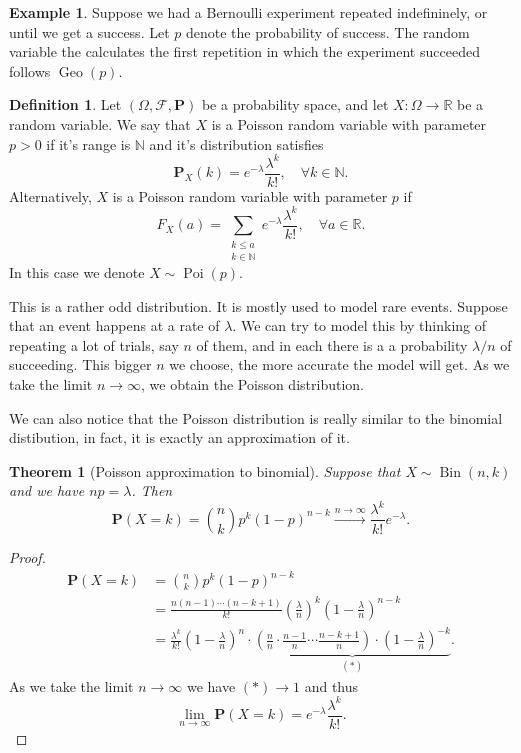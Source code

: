 \documentclass[11pt,a4paper]{article}
\theoremstyle{definition}
\newtheorem{definition}{Definition}[section]
\newtheorem{example}{Example}[section]
\theoremstyle{plain}
\newtheorem{theorem}{Theorem}[section]
\DeclareMathOperator{\Bin}{Bin}
\DeclareMathOperator{\Geo}{Geo}
\DeclareMathOperator{\Poi}{Poi}
\newcommand{\N}{\mathbb{N}}
\newcommand{\R}{\mathbb{R}}
\newcommand{\Prob}{\mathbf{P}}
\begin{document}
  \begin{example}
    Suppose we had a Bernoulli experiment repeated indefininely, or until
    we get a success. Let $p$ denote the probability of success.
    The random variable the calculates the first repetition in which the
    experiment succeeded follows $\Geo(p)$.
  \end{example}

  \begin{definition}
    Let $(\Omega ,\mathcal F, \Prob)$ be a probability space,
    and let $X \colon \Omega \to \R$ be a random variable.
    We say that $X$ is a Poisson random variable with parameter
    $p > 0$ if it's range is $\N$ and it's distribution satisfies
    \[
      \Prob_X(k) = e^{-\lambda} \frac{\lambda^k}{k!}, \quad 
      \forall k \in \N.
    \]
    Alternatively, $X$ is a Poisson random variable with parameter
    $p$ if
    \[
      F_X(a) = \sum_{\substack{k \le a \\ k \in \N}}
      e^{-\lambda} \frac{\lambda^k}{k!}, \quad \forall a \in \R.
    \]
    In this case we denote $X \sim \Poi(p)$.
  \end{definition}
  
  This is a rather odd distribution. It is mostly used to model rare events.
  Suppose that an event happens at a rate of $\lambda$.
  We can try to model this by thinking of repeating a lot of trials,
  say $n$ of them, and in each there is a a probability $\lambda / n$ of 
  succeeding. This bigger $n$ we choose, the more accurate the model will get.
  As we take the limit $n \to \infty$, we obtain the Poisson distribution.
  
  We can also notice that the Poisson distribution is really similar to
  the binomial distibution, in fact, it is exactly an approximation of it.

  \begin{theorem}[Poisson approximation to binomial]
    Suppose that $X \sim \Bin(n,k)$ and we have
    $np = \lambda$. Then
    \[
      \Prob(X = k) = 
      \binom{n}{k} p^{k} (1-p)^{n-k} \xrightarrow{n\to\infty}
      \frac{\lambda^{k}}{k!} e^{-\lambda}.
    \]
  \end{theorem}
  \begin{proof}
    \begin{align*}
      \mathbf {P}(X = k) &= 
      {\binom{n}{k}}p^{k}(1 - p)^{n - k} \\ &= 
      {\frac{n(n - 1) \cdots (n - k + 1)}{k!}} 
      \left(\frac{\lambda}{n}\right)^k
      \left(1 - {\frac{\lambda}{n}}\right)^{n-k} \\ &= 
      \frac{\lambda^{k}}{k!} \left(1-{\frac{\lambda}{n}}\right)^{n} \cdot
      \underbrace{
      \left( {\frac{n}{n}} \cdot 
      {\frac{n - 1}{n}} \cdots {\frac{n - k + 1}{n}} \right) \cdot 
      \left(1 - {\frac{\lambda}{n}}\right)^{-k}}_{(*)}.
    \end{align*}
    As we take the limit $n \to \infty$ we have $(*) \to 1$ and thus
    \[
      \lim_{n\to\infty}\Prob(X=k)=e^{-\lambda}{\frac{\lambda^{k}}{k!}}.
    \]
  \end{proof}
\end{document}
